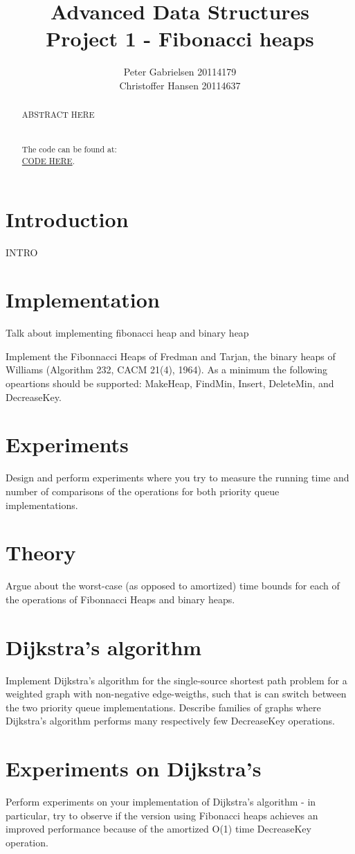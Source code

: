 \documentclass[a4paper,oneside,article,11pt]{memoir}
\title{Advanced Data Structures \\ Project 1 - Fibonacci heaps}
\author{Peter Gabrielsen 20114179 \\
Christoffer Hansen 20114637}
\begin{document}
\begin{titlingpage}
\clearpage

\maketitle
\thispagestyle{empty}

\begin{abstract}
ABSTRACT HERE
\\
\\
\\
The code can be found at: \\\url{CODE HERE}.
\end{abstract}
\end{titlingpage}

\pagebreak

\tableofcontents

\pagebreak

\chapter{Introduction}
INTRO

\chapter{Implementation}
Talk about implementing fibonacci heap and binary heap

Implement
the Fibonnacci Heaps of Fredman and Tarjan,
the binary heaps of Williams (Algorithm 232, CACM 21(4), 1964).
As a minimum the following opeartions should be supported: MakeHeap, FindMin, Insert, DeleteMin, and DecreaseKey.

\chapter{Experiments}
Design and perform experiments where you try to measure the running time and number of comparisons of the operations for both priority queue implementations.


\chapter{Theory}
Argue about the worst-case (as opposed to amortized) time bounds for each of the operations of Fibonnacci Heaps and binary heaps.

\chapter{Dijkstra's algorithm}
Implement Dijkstra's algorithm for the single-source shortest path problem for a weighted graph with non-negative edge-weigths, such that is can switch between the two priority queue implementations.
Describe families of graphs where Dijkstra's algorithm performs many respectively few DecreaseKey operations.

\chapter{Experiments on Dijkstra's}
Perform experiments on your implementation of Dijkstra's algorithm - in particular, try to observe if the version using Fibonacci heaps achieves an improved performance because of the amortized O(1) time DecreaseKey operation.



\end{document}
